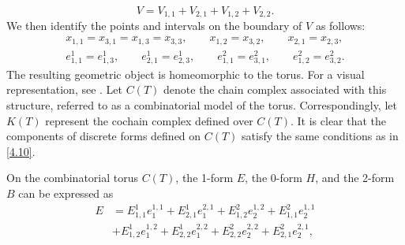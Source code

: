 \documentclass[english]{article}
\theoremstyle{plain}
\theoremstyle{definition}
\theoremstyle{remark}
\numberwithin{equation}{section}
\begin{document}
\begin{equation*}\label{}
   V=V_{1,1}+V_{2,1}+V_{1,2}+V_{2,2}.
\end{equation*}
We then identify the points and intervals on the boundary of
$V$  as follows:
\begin{align}\label{4.10}
x_{1,1}=x_{3,1}=x_{1,3}=x_{3,3}, \qquad x_{1,2}=x_{3,2}, \qquad x_{2,1}=x_{2,3}, \nonumber \\
e_{1,1}^1=e_{1,3}^1, \qquad e_{2,1}^1=e_{2,3}^1, \qquad e_{1,1}^2=e_{3,1}^2, \qquad e_{1,2}^2=e_{3,2}^2.
\end{align}
The resulting geometric object is homeomorphic to the torus. For a visual representation, see \cite[Figure~1]{S5}. Let
$C(T)$ denote the chain complex associated with this structure, referred to as a combinatorial model of the torus.  Correspondingly, let
$K(T)$ represent the cochain complex defined over $C(T)$. It is clear that the components of discrete forms defined on $C(T)$ satisfy the same conditions as in \eqref{4.10}.

On the combinatorial torus $C(T)$,  the 1-form
$E$, the 0-form $H$, and the 2-form $B$ can be expressed as
  \begin{align*}\label{}
    E&=E^1_{1,1}e_1^{1,1}+E^1_{2,1}e_1^{2,1}+E^2_{1,2}e_2^{1,2}+E^2_{1,1}e_2^{1,1} \\
    &+E^1_{1,2}e_1^{1,2}+E^1_{2,2}e_1^{2,2}+E^2_{2,2}e_2^{2,2}+E^2_{2,1}e_2^{2,1},
\end{align*}
\end{document}
